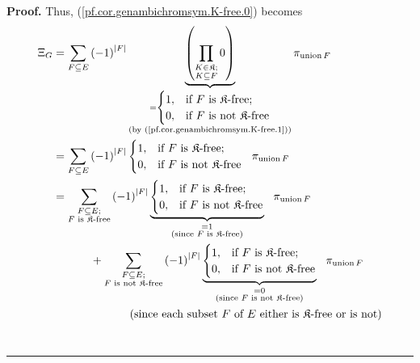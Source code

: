 \documentclass[numbers=enddot,12pt,final,onecolumn,notitlepage]{scrartcl}%
\theoremstyle{definition}
\newenvironment{proof}[1][Proof]{\noindent\textbf{#1.} }{\ \rule{0.5em}{0.5em}}
\newenvironment{verlong}{}{}
\let\sumnonlimits\sum
\let\prodnonlimits\prod
\renewcommand{\sum}{\sumnonlimits\limits}
\renewcommand{\prod}{\prodnonlimits\limits}
\begin{document}
\begin{verlong}
\begin{proof}
Thus, (\ref{pf.cor.genambichromsym.K-free.0}) becomes%
\begin{align*}
\Xi_{G}  &  =\sum_{F\subseteq E}\left(  -1\right)  ^{\left\vert F\right\vert
}\underbrace{\left(  \prod_{\substack{K\in\mathfrak{K};\\K\subseteq
F}}0\right)  }_{\substack{=%
\begin{cases}
1, & \text{if }F\text{ is }\mathfrak{K}\text{-free;}\\
0, & \text{if }F\text{ is not }\mathfrak{K}\text{-free}%
\end{cases}
\\\text{(by (\ref{pf.cor.genambichromsym.K-free.1}))}}}\pi
_{\operatorname*{union}F}\\
&  =\sum_{F\subseteq E}\left(  -1\right)  ^{\left\vert F\right\vert }%
\begin{cases}
1, & \text{if }F\text{ is }\mathfrak{K}\text{-free;}\\
0, & \text{if }F\text{ is not }\mathfrak{K}\text{-free}%
\end{cases}
\ \ \pi_{\operatorname*{union}F}\\
&  =\sum_{\substack{F\subseteq E;\\F\text{ is }\mathfrak{K}\text{-free}%
}}\left(  -1\right)  ^{\left\vert F\right\vert }\underbrace{%
\begin{cases}
1, & \text{if }F\text{ is }\mathfrak{K}\text{-free;}\\
0, & \text{if }F\text{ is not }\mathfrak{K}\text{-free}%
\end{cases}
}_{\substack{=1\\\text{(since }F\text{ is }\mathfrak{K}\text{-free)}}%
}\ \ \pi_{\operatorname*{union}F}\\
&  \ \ \ \ \ \ \ \ \ \ +\sum_{\substack{F\subseteq E;\\F\text{ is not
}\mathfrak{K}\text{-free}}}\left(  -1\right)  ^{\left\vert F\right\vert
}\underbrace{%
\begin{cases}
1, & \text{if }F\text{ is }\mathfrak{K}\text{-free;}\\
0, & \text{if }F\text{ is not }\mathfrak{K}\text{-free}%
\end{cases}
}_{\substack{=0\\\text{(since }F\text{ is not }\mathfrak{K}\text{-free)}%
}}\ \ \pi_{\operatorname*{union}F}\\
&  \ \ \ \ \ \ \ \ \ \ \ \ \ \ \ \ \ \ \ \ \left(  \text{since each subset
}F\text{ of }E\text{ either is }\mathfrak{K}\text{-free or is not}\right) \\

\end{align*}
\end{proof}
\end{verlong}
\end{document}
